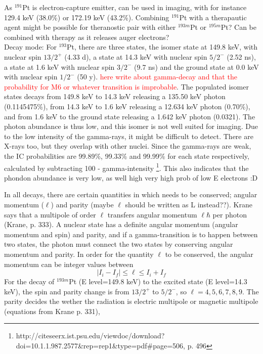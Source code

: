 \noindent 
As $^{191}$Pt is electron-capture emitter, can be used in imaging, with for instance 129.4 keV (38.0\%) or 172.19 keV (43.2\%). Combining $^{191}$Pt with a therapautic agent might be possible for theranostic pair with either $^{193m}$Pt or $^{195m}$Pt? Can be combined with therapy as it releases auger electrons? \\

\noindent
Decay mode: For $^{193}$Pt, there are three states, the isomer state at 149.8 keV, with nuclear spin $13/2^+$ (4.33 d), a state at 14.3 keV with nuclear spin $5/2^-$ (2.52 ns), a state at 1.6 keV with nuclear spin $3/2^-$ (9.7 ns) and the ground state at 0.0 keV with nuclear spin $1/2^-$ (50 y). \textcolor{red}{here write about gamma-decay and that the probability for M6 or whatever transition is improbable}. The populated isomer states decays from 149.8 keV to 14.3 keV releasing a 135.50 keV photon (0.1145475\%), from 14.3 keV to 1.6 keV releasing a 12.634 keV photon (0.70\%), and from 1.6 keV to the ground state releasing a 1.642 keV photon (0.0321). The photon abundance is thus low, and this isomer is not well suited for imaging. Due to the low intensity of the gamma-rays, it might be difficult to detect. There are X-rays too, but they overlap with other nuclei. Since the gamma-rays are weak, the IC probabilities are 99.89\%, 99.33\% and 99.99\% for each state respectively, calculated by subtracting 100 - gamma-intensity \footnote{http://citeseerx.ist.psu.edu/viewdoc/download?doi=10.1.1.987.2577&rep=rep1&type=pdf#page=506, p. 496}. This also indicates that the phondon abundance is very low, as well  high very high prob of low E electrons :D 

In all decays, there are certain quantities in which needs to be conserved; angular momentum ($\ell$) and parity (maybe $\ell$ should be written as L instead??). Krane says that a multipole of order $\ell$ transfers angular momentum $\ell\hbar$ per photon (Krane, p. 333). A nuclear state has a definite angular momentum (angular momentum and spin) and parity, and if a gamma-transition is to happen between two states, the photon must connect the two states by conserving angular momentum and parity. In order for the quantity $\ell$ to be conserved, the angular momentum can be integer values between
\begin{equation}
|I_i-I_f| \leq \ell \leq I_i + I_f
\end{equation}
For the decay of $^{193m}$Pt (E level=149.8 keV) to the excited state (E level=14.3 keV), the spin and parity change is from $13/2^+$ to $5/2^-$, so $\ell=4,5,6,7,8,9$. The parity decides the wether the radiation is electric multipole or magnetic multipole (equations from Krane p. 331), 

